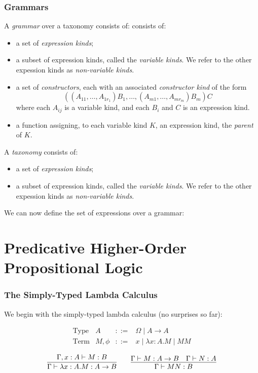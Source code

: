 \documentclass[handout]{beamer}
\begin{document}
\begin{frame}
\frametitle{Grammars}
A \emph{grammar} over a taxonomy consists of: consists of:
\begin{itemize}
\item a set of \emph{expression kinds};
\item a subset of expression kinds, called the \emph{variable kinds}.  We refer to the other expession kinds as \emph{non-variable kinds}.
\item a set of \emph{constructors}, each with an associated \emph{constructor kind} of the form
\begin{equation}
\label{eq:conkind}
 ((A_{11}, \ldots, A_{1r_1}) B_1, \ldots, (A_{m1}, \ldots, A_{mr_m}) B_m) C
\end{equation}
where each $A_{ij}$ is a variable kind, and each $B_i$ and $C$ is an expression kind.
\item a function assigning, to each variable kind $K$, an expression kind, the \emph{parent} of $K$.
\end{itemize}
\end{frame}

\begin{frame}[fragile]
A \emph{taxonomy } consists of:
\begin{itemize}
\item a set of \emph{expression kinds};
\item a subset of expression kinds, called the \emph{variable kinds}.  We refer to the other expession kinds as \emph{non-variable kinds}.
\end{itemize}
{\tiny
{}
}
\end{frame}

\begin{frame}[fragile]
We can now define the set of expressions over a grammar:
\end{frame}

\section{Predicative Higher-Order Propositional Logic}

\begin{frame}
\frametitle{The Simply-Typed Lambda Calculus}
We begin with the simply-typed lambda calculus (no surprises so far):

$$
\begin{array}{lrcl}
\text{Type} & A & ::= & \Omega \mid A \rightarrow A \\
\text{Term} & M,\phi & ::= & x \mid \lambda x:A.M \mid M M
\end{array}
$$

\[ \infer{\Gamma \vdash \lambda x:A.M : A \rightarrow B}{\Gamma, x : A \vdash M : B} \qquad
\infer{\Gamma \vdash M N : B} {\Gamma \vdash M : A \rightarrow B \quad \Gamma \vdash N : A} \]
\end{frame}
\end{document}
